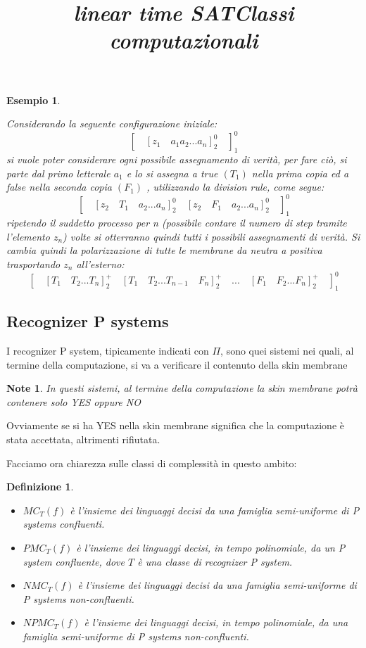 \documentclass[12pt,a4paper]{report}
\newtheorem{note}{Note}[section]
\newtheorem{esempio}{Esempio}[section]
\newtheorem{definizione}{Definizione}[section]
\begin{document}
\begin{esempio}
\title{\emph{linear time SAT}}
\label{ex - lin time sat 1}

Considerando la seguente configurazione iniziale:
$$[ \quad [z_{1} \quad a_{1} a_{2} ... a_{n}]_{2}^{0} \quad ]_{1}^{0}$$
si vuole poter considerare ogni possibile assegnamento di verità, per fare ciò, si parte dal primo letterale $a_{1}$ e lo si assegna a true $(T_{1})$ nella prima copia ed a false nella seconda copia $(F_{1})$ , utilizzando la division rule, come segue:
$$[ \quad [z_{2} \quad T_{1} \quad a_{2} ... a_{n}]_{2}^{0} \quad [z_{2} \quad F_{1} \quad a_{2} ... a_{n}]_{2}^{0} \quad ]_{1}^{0}$$
ripetendo il suddetto processo per n (possibile contare il numero di step tramite l'elemento $z_{n}$) volte si otterranno quindi tutti i possibili assegnamenti di verità.
Si cambia quindi la polarizzazione di tutte le membrane da neutra a positiva trasportando $z_{n}$ all'esterno:
$$[ \quad [T_{1} \quad T_{2} ... T_{n}]_{2}^{+} \quad [T_{1} \quad T_{2} ... T_{n-1} \quad F_{n}]_{2}^{+} \quad ... \quad [F_{1} \quad F_{2} ... F_{n}]_{2}^{+} \quad ]_{1}^{0}$$
\end{esempio}

\subsection{Recognizer P systems}
I recognizer P system, tipicamente indicati con $\Pi$, sono quei sistemi nei quali, al termine della computazione, si va a verificare il contenuto della skin membrane
\begin{note}
In questi sistemi, al termine della computazione la skin membrane potrà contenere solo YES oppure NO
\end{note}
Ovviamente se si ha YES nella skin membrane significa che la computazione è stata accettata, altrimenti rifiutata.

Facciamo ora chiarezza sulle classi di complessità in questo ambito:
\begin{definizione}
\title{\emph{Classi computazionali}}
\begin{itemize}
\item $MC_{T}(f)$ è l'insieme dei linguaggi decisi da una famiglia semi-uniforme di P systems confluenti.
\item $PMC_{T}(f)$ è l'insieme dei linguaggi decisi, in tempo polinomiale, da un P system confluente, dove $T$ è una classe di recognizer P system.
\item $NMC_{T}(f)$ è l'insieme dei linguaggi decisi da una famiglia semi-uniforme di P systems non-confluenti.
\item $NPMC_{T}(f)$ è l'insieme dei linguaggi decisi, in tempo polinomiale, da una famiglia semi-uniforme di P systems non-confluenti.
\end{itemize}
\end{definizione}
\end{document}
